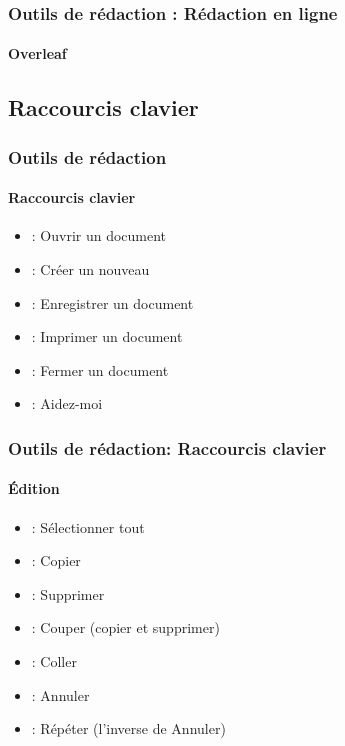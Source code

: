 \documentclass[xcolor=table]{beamer}
\begin{document}
\begin{frame}
\frametitle{Outils de rédaction : Rédaction en ligne}
\framesubtitle{Overleaf}

\begin{center}
\end{center}

\end{frame}

\subsection{Raccourcis clavier}

\begin{frame}
\frametitle{Outils de rédaction}
\framesubtitle{Raccourcis clavier}

\begin{itemize}
	\item {} : Ouvrir un document
	\item {} : Créer un nouveau
	\item {} : Enregistrer un document
	\item {} : Imprimer un document 
	\item {} : Fermer un document
	\item {} : Aidez-moi
\end{itemize}

\end{frame}

\begin{frame}
\frametitle{Outils de rédaction: Raccourcis clavier}
\framesubtitle{Édition}

\begin{itemize}
	\item {} : Sélectionner tout
	\item {} : Copier
	\item {} : Supprimer
	\item {} : Couper (copier et supprimer)
	\item {} : Coller
	\item {} : Annuler
	\item {} : Répéter (l'inverse de Annuler)
\end{itemize}

\end{frame}
\end{document}
